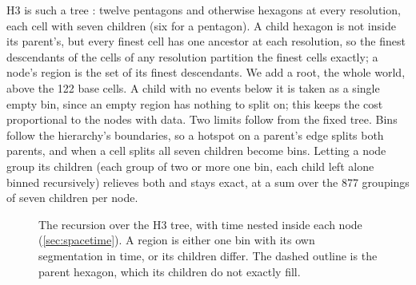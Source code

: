 \documentclass[11pt,a4paper]{article}
\begin{document}
H3 is such a tree \citep{h3}: twelve pentagons and otherwise hexagons at every resolution, each cell
with seven children (six for a pentagon). A child hexagon is not inside its parent's, but every
finest cell has one ancestor at each resolution, so the finest descendants of the cells of any
resolution partition the finest cells exactly; a node's region is the set of its finest
descendants. We add a root, the whole world, above the 122 base cells. A child with no events
below it is taken as a single empty bin, since an empty region has nothing to split on; this keeps
the cost proportional to the nodes with data. Two limits follow from the fixed tree. Bins follow
the hierarchy's boundaries, so a hotspot on a parent's edge splits both parents, and when a cell
splits all seven children become bins. Letting a node group its children (each group of two or
more one bin, each child left alone binned recursively) relieves both and stays exact, at a sum
over the 877 groupings of seven children per node.

\begin{figure}[t]
\centering
{}
\caption{The recursion over the H3 tree, with time nested inside each node
(\cref{sec:spacetime}). A region is either one bin with its own segmentation in time, or its
children differ. The dashed outline is the parent hexagon, which its children do not exactly
fill.}
\label{fig:tree}
\end{figure}
\end{document}
